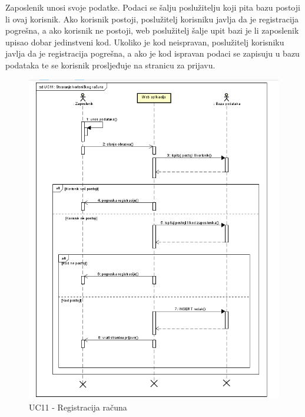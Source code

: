 		\pagebreak
		Zaposlenik unosi svoje podatke. Podaci se šalju poslužitelju koji pita bazu postoji li ovaj korisnik. Ako korisnik postoji, poslužitelj korisniku javlja da je registracija pogrešna, a ako korisnik ne postoji, web poslužitelj šalje upit bazi je li zaposlenik upisao dobar jedinstveni kod. Ukoliko je kod neispravan, poslužitelj korisniku javlja da je registracija pogrešna, a ako je kod ispravan podaci se zapisuju u bazu podataka te se korisnik prosljeđuje na stranicu za prijavu.
		\begin{figure}[H]
			\includegraphics[scale=0.8]{slike/UC11 - Stvaranje korisnickog racuna.png} %
			\centering
			\caption{UC11 -  Registracija računa}
			\label{uc5}
		\end{figure}
	
